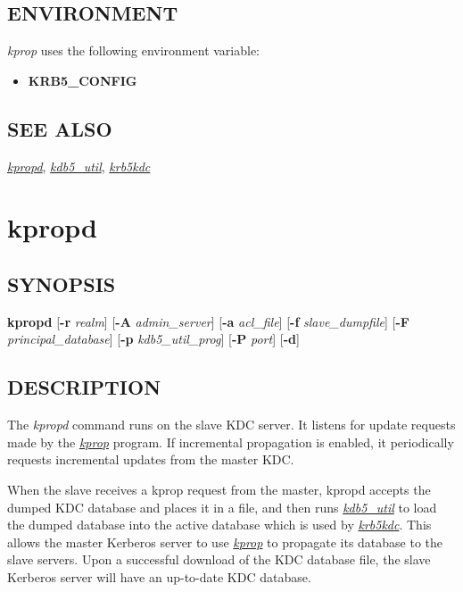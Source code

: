 \documentclass[letterpaper,10pt,english]{sphinxmanual}
\begin{document}
\subsection{ENVIRONMENT}
\label{admin/admin_commands/kprop:environment}
\emph{kprop} uses the following environment variable:
\begin{itemize}
\item {} 
\textbf{KRB5\_CONFIG}

\end{itemize}


\subsection{SEE ALSO}
\label{admin/admin_commands/kprop:see-also}
{\hyperref[admin/admin_commands/kpropd:kpropd-8]{\emph{kpropd}}}, {\hyperref[admin/admin_commands/kdb5_util:kdb5-util-8]{\emph{kdb5\_util}}}, {\hyperref[admin/admin_commands/krb5kdc:krb5kdc-8]{\emph{krb5kdc}}}


\section{kpropd}
\label{admin/admin_commands/kpropd::doc}\label{admin/admin_commands/kpropd:kpropd}\label{admin/admin_commands/kpropd:kpropd-8}

\subsection{SYNOPSIS}
\label{admin/admin_commands/kpropd:synopsis}
\textbf{kpropd}
{[}\textbf{-r} \emph{realm}{]}
{[}\textbf{-A} \emph{admin\_server}{]}
{[}\textbf{-a} \emph{acl\_file}{]}
{[}\textbf{-f} \emph{slave\_dumpfile}{]}
{[}\textbf{-F} \emph{principal\_database}{]}
{[}\textbf{-p} \emph{kdb5\_util\_prog}{]}
{[}\textbf{-P} \emph{port}{]}
{[}\textbf{-d}{]}


\subsection{DESCRIPTION}
\label{admin/admin_commands/kpropd:description}
The \emph{kpropd} command runs on the slave KDC server.  It listens for
update requests made by the {\hyperref[admin/admin_commands/kprop:kprop-8]{\emph{kprop}}} program.  If incremental
propagation is enabled, it periodically requests incremental updates
from the master KDC.

When the slave receives a kprop request from the master, kpropd
accepts the dumped KDC database and places it in a file, and then runs
{\hyperref[admin/admin_commands/kdb5_util:kdb5-util-8]{\emph{kdb5\_util}}} to load the dumped database into the active
database which is used by {\hyperref[admin/admin_commands/krb5kdc:krb5kdc-8]{\emph{krb5kdc}}}.  This allows the master
Kerberos server to use {\hyperref[admin/admin_commands/kprop:kprop-8]{\emph{kprop}}} to propagate its database to
the slave servers.  Upon a successful download of the KDC database
file, the slave Kerberos server will have an up-to-date KDC database.
\end{document}
